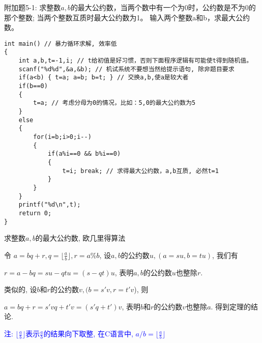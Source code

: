 \begin{frame}
附加题5-1: 求整数$a,b$的最大公约数，当两个数中有一个为0时，公约数是不为0的那个整数; 当两个整数互质时最大公约数为1。
输入两个整数a和b，求最大公约数。 
\pause
\begin{lstlisting}
int main() // 暴力循环求解, 效率低
{
	int a,b,t=-1,i; // t给初值是好习惯，否则下面程序逻辑有可能使t得到随机值。 
	scanf("%d%d",&a,&b); // 机试系统不要想当然给提示语句, 除非题目要求  
	if(a<b) { t=a; a=b; b=t; } // 交换a,b,使a是较大者 
	if(b==0) 
	{
		t=a; // 考虑分母为0的情况，比如：5,0的最大公约数为5 
	} 
	else
	{
		for(i=b;i>0;i--)
		{
			if(a%i==0 && b%i==0)
			{
				t=i; break; // 求得最大公约数，a,b互质, 必然t=1 
			}
		}
	}
	printf("%d\n",t);
	return 0;	
}
\end{lstlisting}
\end{frame}

\begin{frame}[fragile]{求整数$a,b$的最大公约数, 欧几里得算法}

令 $a=bq+r, q=\lfloor\frac{a}{b}\rfloor,r=a\%b$, 设$a,b$的公约数$u,(a=su, b=tu)$, 我们有

$r=a-bq=su-qtu=(s-qt)u$, 表明$a,b$的公约数$u$也整除$r$. 

类似的, 设$b$和$r$的公约数$v,(b=s'v, r=t'v$), 则

$a=bq+r=s'vq+t'v=(s'q+t')v$, 表明$b$和$r$的公约数$v$也整除$a$. 得到定理的结论.

\medskip
\small\textcolor{blue}{注: $\lfloor\frac{a}{b}\rfloor$表示$\frac{a}{b}$的结果向下取整, 在C语言中, $a/b=\lfloor\frac{a}{b}\rfloor$}
\end{frame}

